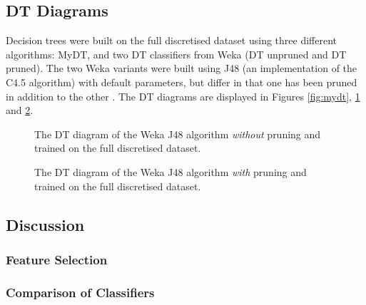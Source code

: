 \subsection{DT Diagrams}
Decision trees were built on the full discretised dataset using three different algorithms: MyDT, and two DT classifiers from Weka (DT unpruned and DT pruned). The two Weka variants were built using J48 (an implementation of the C4.5 algorithm) with default parameters, but differ in that one has been pruned in addition to the other \cite{weka}. The DT diagrams are displayed in Figures \ref{fig:mydt}, \ref{fig:dt_unprune} and \ref{fig:dt_prune}.

\begin{figure}[h!]
    \begin{obeylines}
        
    \end{obeylines}
    \caption{The DT diagram of the Weka J48 algorithm \textit{without} pruning and trained on the full discretised dataset.\label{fig:dt_unprune}}
\end{figure}

\begin{figure}[h!]
    \begin{obeylines}
        
    \end{obeylines}
    \caption{The DT diagram of the Weka J48 algorithm \textit{with} pruning and trained on the full discretised dataset.\label{fig:dt_prune}}
\end{figure}

\subsection{Discussion}

\subsubsection{Feature Selection}

\subsubsection{Comparison of Classifiers}
